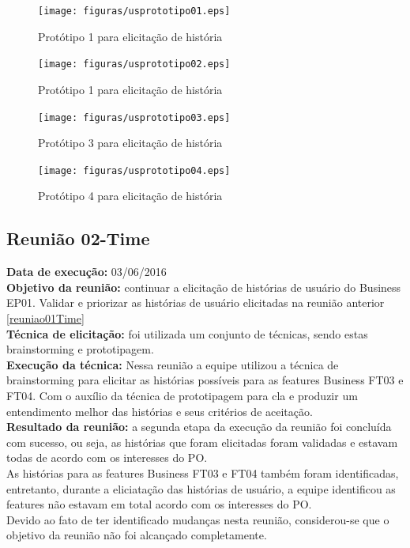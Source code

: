 \begin{figure}[H]
    \centering
    \texttt{[image: figuras/usprototipo01.eps]}
    \caption[Protótipo 1 de história]{Protótipo 1 para elicitação de história\label{usprototipo01}}
\end{figure}
\begin{figure}[H]
    \centering
    \texttt{[image: figuras/usprototipo02.eps]}
    \caption[Protótipo 2 de história]{Protótipo 1 para elicitação de história\label{usprototipo02}}
\end{figure}
\begin{figure}[H]
    \centering
    \texttt{[image: figuras/usprototipo03.eps]}
    \caption[Protótipo 3 de história]{Protótipo 3 para elicitação de história\label{usprototipo03}}
\end{figure}
\begin{figure}[H]
    \centering
    \texttt{[image: figuras/usprototipo04.eps]}
    \caption[Protótipo 4 de história]{Protótipo 4 para elicitação de história\label{usprototipo04}}
\end{figure}


\subsection{Reunião 02-Time}\label{reuniao02Time}

 \indent \textbf{Data de execução:} 03/06/2016\\
 \indent \textbf{Objetivo da reunião:} continuar a elicitação de histórias de usuário do Business EP01. Validar e priorizar as histórias de usuário elicitadas na reunião anterior \ref{reuniao01Time}\\
 \indent \textbf{Técnica de elicitação:} foi utilizada um conjunto de técnicas, sendo estas brainstorming e prototipagem.\\
 \indent \textbf{Execução da técnica:} Nessa reunião a equipe utilizou a técnica de brainstorming para elicitar as histórias possíveis para as features Business FT03 e FT04. Com o auxílio da técnica de prototipagem para cla e produzir um entendimento melhor das histórias e seus critérios de aceitação.\\

 \indent \textbf{Resultado da reunião:} a segunda etapa da execução da reunião foi concluída com sucesso, ou seja, as histórias que foram elicitadas foram validadas e estavam todas de acordo com os interesses do PO.\\
 \indent As histórias para as features Business FT03 e FT04 também foram identificadas, entretanto, durante a eliciatação das histórias de usuário, a equipe identificou as features não estavam em total acordo com os interesses do PO.\\
 \indent Devido ao fato de ter identificado mudanças nesta reunião, considerou-se que o objetivo da reunião não foi alcançado completamente.\\


